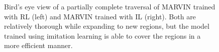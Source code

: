 \begin{figure}[t]
\begin{center}
\begin{tabular}{ll}
    \end{tabular}
  \fi
  \caption{Bird's eye view of a partially complete traversal
  of MARVIN trained with RL (left) and MARVIN trained with IL
  (right). Both are relatively thorough while expanding to new
  regions, but the model trained using imitation learning is
  able to cover the regions in a more efficient manner.}
  \label{fig:il_rl}
  \end{center}
\end{figure}